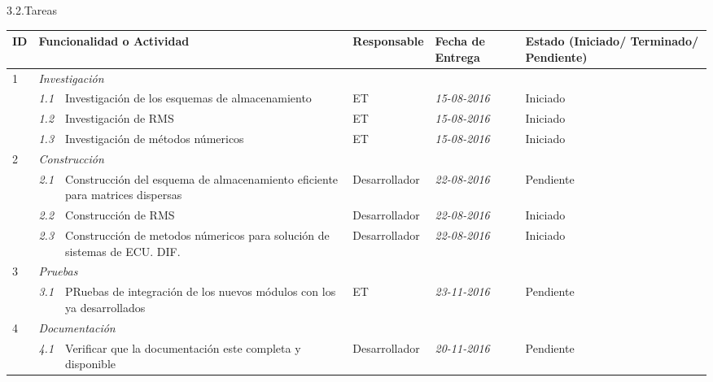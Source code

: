 \documentclass[12pt]{report}
\numberwithin{equation}{section}
\begin{document}
\begin{flushleft}
\large{3.2.Tareas}\\
\begin{table}[H]
\centering
\begin{tabular}{|m{0.5cm}|m{0.7cm}|m{2.5cm}|m{3cm}|m{2.5cm}|m{2.5cm}|}
\hline
\textbf{ID} & \multicolumn{2}{|l|}{\textbf{Funcionalidad o Actividad}} & \textbf{Responsable} & \textbf{Fecha de Entrega} & \textbf{Estado (Iniciado/ Terminado/ Pendiente)}\\
\hline \hline
1 & \multicolumn{5}{|l|}{\textit{Investigaci\'on}}\\
\hline
  & \textit{1.1} & \small{Investigaci\'on de los esquemas de almacenamiento} & \small{ET} & \small{\textit{15-08-2016}} &  \small{Iniciado}\\ 
\hline
  & \textit{1.2} &\small{Investigaci\'on de RMS} & \small{ET}& \small{\textit{15-08-2016}} &  \small{Iniciado}\\
\hline
  & \textit{1.3} &\small{Investigaci\'on de métodos n\'umericos} & \small{ET}& \small{\textit{15-08-2016}} &  \small{Iniciado}\\ 
\hline
2 & \multicolumn{5}{|l|}{\textit{Construcci\'on}}\\
\hline
  & \textit{2.1} & \small{Construcci\'on del esquema de almacenamiento eficiente para matrices dispersas} &\small{Desarrollador} & \small{\textit{22-08-2016}} &  \small{Pendiente} \\ 
\hline
  & \textit{2.2} & \small{Construcci\'on de RMS} &\small{Desarrollador} & \small{\textit{22-08-2016}} &  \small{Iniciado} \\ 
\hline
  & \textit{2.3} & \small{Construcci\'on de metodos n\'umericos para soluci\'on de sistemas de ECU. DIF.} &\small{Desarrollador} & \small{\textit{22-08-2016}} &  \small{Iniciado} \\ 
\hline
3 & \multicolumn{5}{|l|}{\textit{Pruebas}}\\
\hline
  & \textit{3.1} & \small{PRuebas de integraci\'on de los nuevos módulos con los ya desarrollados} & \small{ET} & \small{\textit{23-11-2016}} &  \small{Pendiente} \\ 
\hline
4 & \multicolumn{5}{|l|}{\textit{Documentaci\'on}}\\
\hline
  & \textit{4.1} & \small{Verificar que la documentaci\'on este completa y disponible} & \small{Desarrollador} & \small{\textit{20-11-2016}} &  \small{Pendiente} \\ 
\hline


\end{tabular}
\end{table}
\end{flushleft}
\end{document}
